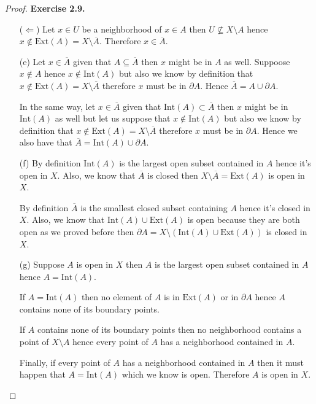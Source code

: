 \documentclass[11pt]{article}
\newcommand{\inter}{\text{Int}}
\newcommand{\ext}{\text{Ext}}
\newcommand{\setmin}{\setminus}
\theoremstyle{definition}
\begin{document}
\begin{proof}{\textbf{Exercise 2.9.}}
\begin{itemize}
        ($\Leftarrow$) Let $x \in U$ be a neighborhood of $x \in A$ then
        $U \not\subseteq X \setmin A$ hence
        $x \not\in \ext(A) = X \setmin \overline{A}$. Therefore
        $x \in \overline{A}$.

        \item [(e)]
        Let $x \in \overline{A}$ given that $A \subseteq \overline{A}$ then
        $x$ might be in $A$ as well. Suppoose $x \not\in A$ hence
        $x \not\in \inter(A)$ but also we know by definition that
        $x \not\in \ext(A) = X \setmin \overline{A}$ therefore $x$ must be in
        $\partial A$. Hence $\overline{A} = A \cup \partial A$.

        In the same way, let $x \in \overline{A}$ given that
        $\inter(A) \subset \overline{A}$ then $x$ might be in $\inter(A)$ as
        well but let us suppose that $x \not\in \inter(A)$ but also we know by
        definition that $x \not\in \ext(A) = X \setmin \overline{A}$ therefore
        $x$ must be in $\partial A$. Hence we also have that
        $\overline{A} = \inter(A) \cup \partial A$.

        \item [(f)] By definition $\inter(A)$ is the largest open subset
        contained in $A$ hence it's open in $X$. Also, we know that
        $\overline{A}$ is closed then $X \setmin \overline{A} = \ext(A)$
        is open in $X$.

        By definition $\overline{A}$ is the smallest closed subset containing
        $A$ hence it's closed in $X$. Also, we know that $\inter(A) \cup \ext(A)$
        is open because they are both open as we proved before then
        $\partial A = X \setmin (\inter(A) \cup \ext(A))$ is closed in $X$.

        \item [(g)]
        Suppose $A$ is open in $X$ then $A$ is the largest open subset contained
        in $A$ hence $A = \inter(A)$.

        If $A = \inter(A)$ then no element of $A$ is in $\ext(A)$ or in
        $\partial A$ hence $A$ contains none of its boundary points.
        
        If $A$ contains none of its boundary points then no neighborhood
        contains a point of $X \setmin A$ hence every point of $A$ has a
        neighborhood contained in $A$.

        Finally, if every point of $A$ has a neighborhood contained in $A$
        then it must happen that $A = \inter(A)$ which we know is open.
        Therefore $A$ is open in $X$.


\end{itemize}
\end{proof}
\end{document}
